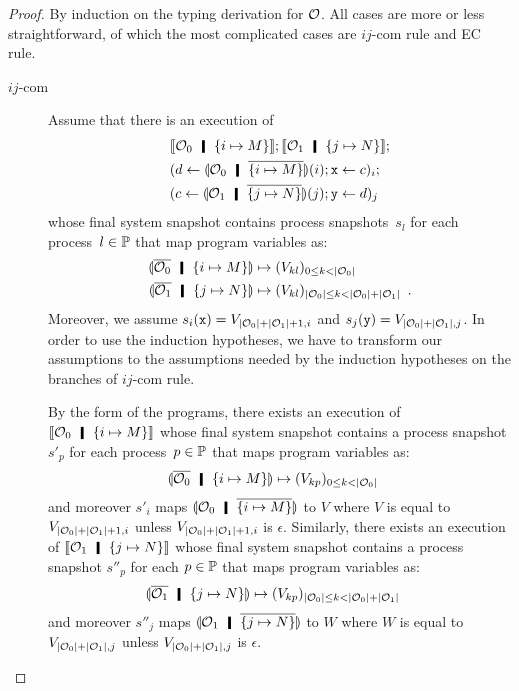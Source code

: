    \begin{proof}
    By induction on the typing derivation for $\mathcal{O}$.
    All cases are more or less straightforward, of which the most
    complicated cases are $ij$-com rule and EC rule.
    \begin{description}
     \item[$ij$-com]
	  Assume that there is an execution of
	  \begin{align*}
	   &\semo{\hypert_0\hmid \imapsto{M}};
	   \semo{\hypert_1\hmid \jmapsto{N}};\\
	   &(d\leftarrow \semoi{\hypert_0\hmid\overline{\imapsto M}}(i); \p
	   x\leftarrow c)_i; \\
	   &(c\leftarrow \semoi{\hypert_1\hmid\overline{\jmapsto N}}(j); \p
	   y\leftarrow d)_j
	  \end{align*}
	  whose final system snapshot contains process snapshots~$s_l$
	  for each process~$l\in\mathbb{P}$ that map program variables as:
	  \begin{align*}
	   \semoi{\overline{\hypert_0}\hmid \imapsto{M}}&\mapsto
	   (V_{kl})_{0\le k < |\hypert_0|}\\
	   \semoi{\overline{\hypert_1}\hmid \jmapsto{N}}&\mapsto
	   (V_{kl})_{|\hypert_0|\le k < |\hypert_0| + |\hypert_1|}\enspace.
	  \end{align*}
	  Moreover, we assume $s_i(\texttt{x}) = V_{|\mathcal{O}_0|+|\mathcal{O}_1|+1,i}$
	  and $s_j(\texttt{y}) = V_{|\mathcal{O}_0| + |\mathcal{O}_1|,j}$.
	  In order to use the induction hypotheses, we have to transform
	  our assumptions to the assumptions needed by the induction
	  hypotheses on the branches of $ij$-com rule.

	  By the form of the programs,
	  there exists an execution of $\semo{\hypert_0\hmid
	  \imapsto{M}}$
	  whose final system snapshot contains a process snapshot
	  $s'_p$ for each process~$p\in \mathbb{P}$
	  that maps program variables as:
	  \begin{align*}
	   \semoi{\overline{\hypert_0}\hmid \imapsto{M}}&\mapsto
	   (V_{kp})_{0\le k < |\hypert_0|}
	  \end{align*}
	  and moreover $s'_i$ maps $\semoi{\hypert_0\hmid
	  \overline{\imapsto{M}}}$ to $V$ where $V$ is equal to
	  $V_{|\mathcal{O}_0|+|\mathcal{O}_1|+1,i}$ unless
	  $V_{|\mathcal{O}_0|+|\mathcal{O}_1|+1,i}$ is $\epsilon$.
	  Similarly,
	  there exists an execution of $\semo{\hypert_1\hmid
	  \jmapsto{N}}$
	  whose final system snapshot contains a process snapshot
	  $s''_p$ for each $p\in\mathbb{P}$
	  that maps program variables as:
	  \begin{align*}
	   \semoi{\overline{\hypert_1}\hmid \jmapsto{N}}&\mapsto
	   (V_{kp})_{|\hypert_0|\le k < |\hypert_0| + |\hypert_1|}
	  \end{align*}
	  and moreover $s''_j$ maps $\semoi{\hypert_1\hmid
	  \overline{\jmapsto{N}}}$ to $W$ where $W$ is
	  equal to $V_{|\mathcal{O}_0|+|\mathcal{O}_1|,j}$ unless
	  $V_{|\mathcal{O}_0|+|\mathcal{O}_1|,j}$ is $\epsilon$.


\end{description}
\end{proof}
